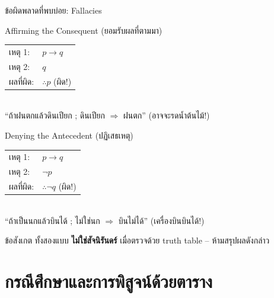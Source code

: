 \begin{frame}{ข้อผิดพลาดที่พบบ่อย: Fallacies}
  \begin{alertblock}{Affirming the Consequent (ยอมรับผลที่ตามมา)}
    \begin{tabular}{l l}
      เหตุ 1: & $p \rightarrow q$ \\
      เหตุ 2: & $q$ \\ \hline
      ผลที่ผิด: & $\therefore p$ \quad (ผิด!)
    \end{tabular} \\
    ``ถ้าฝนตกแล้วดินเปียก ; ดินเปียก $\Rightarrow$ ฝนตก'' (อาจจะรดน้ำต้นไม้!)
  \end{alertblock}
  \vspace{0.4em}
  \begin{alertblock}{Denying the Antecedent (ปฏิเสธเหตุ)}
    \begin{tabular}{l l}
      เหตุ 1: & $p \rightarrow q$ \\
      เหตุ 2: & $\neg p$ \\ \hline
      ผลที่ผิด: & $\therefore \neg q$ \quad (ผิด!)
    \end{tabular} \\
    ``ถ้าเป็นนกแล้วบินได้ ; ไม่ใช่นก $\Rightarrow$ บินไม่ได้'' (เครื่องบินบินได้!)
  \end{alertblock}
  \vspace{0.4em}
  \begin{block}{ข้อสังเกต}
    ทั้งสองแบบ \textbf{ไม่ใช่สัจนิรันดร์} เมื่อตรวจด้วย truth table -- ห้ามสรุปผลดังกล่าว
  \end{block}
\end{frame}


\section{กรณีศึกษาและการพิสูจน์ด้วยตาราง}

